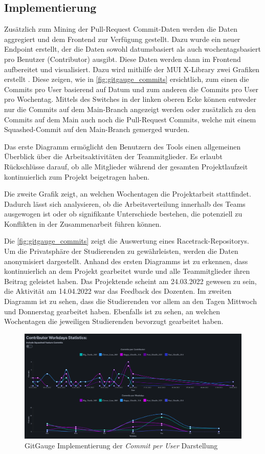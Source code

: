 \subsection{Implementierung}
Zusätzlich zum Mining der Pull-Request Commit-Daten werden die Daten aggregiert und dem Frontend zur Verfügung gestellt. Dazu wurde ein neuer Endpoint erstellt, der die Daten sowohl datumsbasiert als auch wochentagsbasiert pro Benutzer (Contributor) ausgibt. Diese Daten werden dann im Frontend aufbereitet und visualisiert. Dazu wird mithilfe der MUI X-Library zwei Grafiken erstellt \parencite{noauthor_react_nodate}. Diese zeigen, wie in \autoref{fig:gitgauge_commits} ersichtlich, zum einen die Commits pro User basierend auf Datum und zum anderen die Commits pro User pro Wochentag. Mittels des Switches in der linken oberen Ecke können entweder nur die Commits auf dem Main-Branch angezeigt werden oder zusätzlich zu den Commits auf dem Main auch noch die Pull-Request Commits, welche mit einem Squashed-Commit auf den Main-Branch gemerged wurden.

Das erste Diagramm ermöglicht den Benutzern des Tools einen allgemeinen Überblick über die Arbeitsaktivitäten der Teammitglieder. Es erlaubt Rückschlüsse darauf, ob alle Mitglieder während der gesamten Projektlaufzeit kontinuierlich zum Projekt beigetragen haben.

Die zweite Grafik zeigt, an welchen Wochentagen die Projektarbeit stattfindet. Dadurch lässt sich analysieren, ob die Arbeitsverteilung innerhalb des Teams ausgewogen ist oder ob signifikante Unterschiede bestehen, die potenziell zu Konflikten in der Zusammenarbeit führen können.

Die \autoref{fig:gitgauge_commits} zeigt die Auswertung eines Racetrack-Repositorys. Um die Privatsphäre der Studierenden zu gewährleisten, werden die Daten anonymisiert dargestellt. Anhand des ersten Diagramms ist zu erkennen, dass kontinuierlich an dem Projekt gearbeitet wurde und alle Teammitglieder ihren Beitrag geleistet haben. Das Projektende scheint am 24.03.2022 gewesen zu sein, die Aktivität am 14.04.2022 war das Feedback des Dozenten. Im zweiten Diagramm ist zu sehen, dass die Studierenden vor allem an den Tagen Mittwoch und Donnerstag gearbeitet haben. Ebenfalls ist zu sehen, an welchen Wochentagen die jeweiligen Studierenden bevorzugt gearbeitet haben.
\begin{figure}[htbp]
\includegraphics[width=\textwidth]{Figures/gitgauge_commits.png}
\caption{GitGauge Implementierung der \textit{Commit per User} Darstellung }
\label{fig:gitgauge_commits}
\end{figure}



